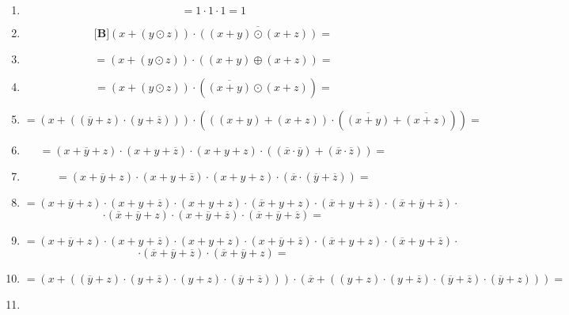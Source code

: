 \begin{enumerate}
\begin{enumerate}
\begin{enumerate}
\begin{enumerate}
\begin{enumerate}
        \item
          \[{= {{1 \cdot 1} \cdot 1}} = 1\]
        \item
          \[{\lbrack\mathbf{B}\rbrack}{{{({x + {({y \odot z})}})} \cdot \overline{({{({x+y})}\odot{({x+z})}})}} =}\]
        \item
          \[{= {{({x + {({y \odot z})}})} \cdot {({{({x + y})} \oplus {({x + z})}})}}} =\]
        \item
          \[{= {{({x + {({y \odot z})}})} \cdot {({\overline{({x+y})} \odot {({x + z})}})}}} =\]
        \item
          \[{= {{({x + {({{({\overline{y} + z})} \cdot {({y + \overline{z}})}})}})} \cdot {({{({{({x + y})} + {({x + z})}})} \cdot {({\overline{({x+y})} + \overline{({x+z})}})}})}}} =\]
        \item
          \[{= {{{{({{x + \overline{y}} + z})} \cdot {({{x + y} + \overline{z}})}} \cdot {({{x + y} + z})}} \cdot \left( {\left( {\overline{x} \cdot \overline{y}} \right) + \left( {\overline{x} \cdot \overline{z}} \right)} \right)}} =\]
        \item
          \[{= {{{{({{x + \overline{y}} + z})} \cdot {({{x + y} + \overline{z}})}} \cdot {({{x + y} + z})}} \cdot {({\overline{x} \cdot {({\overline{y} + \overline{z}})}})}}} =\]
        \item
          \[= {{{{{{{({{x + \overline{y}} + z})} \cdot {({{x + y} + \overline{z}})}} \cdot {({{x + y} + z})}} \cdot {({{\overline{x} + y} + z})}} \cdot {({{\overline{x} + y} + \overline{z}})}} \cdot {({{\overline{x} + \overline{y}} + \overline{z}})}} \cdot}\]\[{{{\cdot {({{\overline{x} + \overline{y}} + z})}} \cdot {({{x + \overline{y}} + \overline{z}})}} \cdot {({{\overline{x} + \overline{y}} + \overline{z}})}} =\]
        \item
          \[= {{{{{{{({{x + \overline{y}} + z})} \cdot {({{x + y} + \overline{z}})}} \cdot {({{x + y} + z})}} \cdot {({{x + \overline{y}} + \overline{z}})}} \cdot {({{\overline{x} + y} + z})}} \cdot {({{\overline{x} + y} + \overline{z}})}} \cdot}\]\[{{\cdot {({{\overline{x} + \overline{y}} + \overline{z}})}} \cdot {({{\overline{x} + \overline{y}} + z})}} =\]
        \item
          \[{= {{({x + {({{{{({\overline{y} + z})} \cdot {({y + \overline{z}})}} \cdot {({y + z})}} \cdot {({\overline{y} + \overline{z}})}})}})} \cdot {({\overline{x} + {({{{{({y + z})} \cdot {({y + \overline{z}})}} \cdot {({\overline{y} + \overline{z}})}} \cdot {({\overline{y} + z})}})}})}}} =\]
        \item

\end{enumerate}
\end{enumerate}
\end{enumerate}
\end{enumerate}
\end{enumerate}
